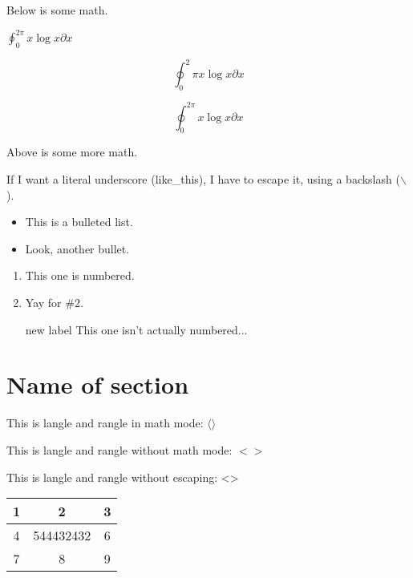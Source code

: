 \documentclass[letterpaper,10pt,titlepage]{article}
\begin{document}
Below is some math.

$
\oint_0^{2\pi} x \log x \partial x
$

$$
\oint_0^2\pi x \log x \partial x
$$

\begin{equation}
\oint_0^{2\pi} x \log x \partial x
\end{equation}

Above is some more math.

If I want a literal underscore (like\_this), I have to escape it, using a backslash ($\backslash$).


\begin{itemize}
\item This is a bulleted list.
\item Look, another bullet.
\end{itemize}

\begin{enumerate}
\item This one is numbered.
\item Yay for \#2.
\item[new label] This one isn't actually numbered...
\end{enumerate}

\section*{Name of section}

This is langle and rangle in math mode: $\langle \rangle$

This is langle and rangle without math mode: $<>$

This is langle and rangle without escaping: <>

\begin{tabular}{|c|c|c|}
  \hline
  1 & 2 & 3 \\ \hline
  4 & 544432432 & 6 \\ \hline
  7 & 8 & 9 \\ \hline 
\end{tabular}


%
\end{document}
